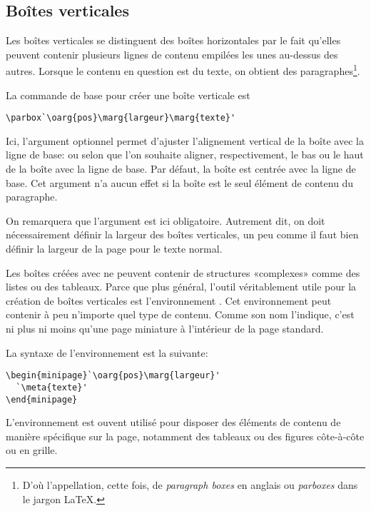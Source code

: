\subsection{Boîtes verticales}
\label{sec:tableaux:boites:parbox}

Les boîtes verticales se distinguent des boîtes horizontales par le
fait qu'elles peuvent contenir plusieurs lignes de contenu empilées
les unes au-dessus des autres. Lorsque le contenu en question est du
texte, on obtient des paragraphes\footnote{%
  D'où l'appellation, cette fois, de \emph{paragraph boxes} en anglais
  ou \emph{parboxes} dans le jargon {\LaTeX}.}. %

La commande de base pour créer une boîte verticale est
\begin{lstlisting}
\parbox`\oarg{pos}\marg{largeur}\marg{texte}'
\end{lstlisting}
Ici, l'argument optionnel  permet d'ajuster l'alignement
vertical de la boîte avec la ligne de base:  ou  selon
que l'on souhaite aligner, respectivement, le bas ou le haut de la
boîte avec la ligne de base. Par défaut, la boîte est centrée avec la
ligne de base. Cet argument n'a aucun effet si la boîte est le seul
élément de contenu du paragraphe.

On remarquera que l'argument  est ici obligatoire.
Autrement dit, on doit nécessairement définir la largeur des boîtes
verticales, un peu comme il faut bien définir la largeur de la page
pour le texte normal.

Les boîtes créées avec \cmd{\parbox} ne peuvent contenir de structures
«complexes» comme des listes ou des tableaux. Parce que plus général,
l'outil véritablement utile pour la création de boîtes verticales est
l'environnement . Cet environnement peut contenir à peu
n'importe quel type de contenu. Comme son nom l'indique, c'est ni plus
ni moins qu'une page miniature à l'intérieur de la page standard.

La syntaxe de l'environnement  est la suivante:
\begin{lstlisting}
\begin{minipage}`\oarg{pos}\marg{largeur}'
  `\meta{texte}'
\end{minipage}
\end{lstlisting}

L'environnement  est ouvent utilisé pour disposer des
éléments de contenu de manière spécifique sur la page, notamment des
tableaux ou des figures côte-à-côte ou en grille.

